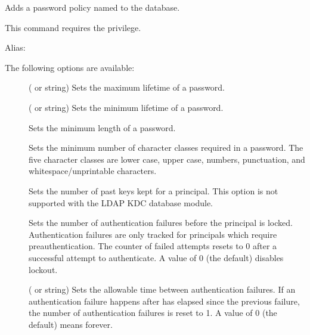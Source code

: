 \documentclass[letterpaper,10pt,english]{sphinxmanual}
\begin{document}
Adds a password policy named  to the database.

This command requires the  privilege.

Alias: 

The following options are available:
\begin{description}
\item[{ }] \leavevmode
( or  string) Sets the maximum
lifetime of a password.

\item[{ }] \leavevmode
( or  string) Sets the minimum
lifetime of a password.

\item[{ }] \leavevmode
Sets the minimum length of a password.

\item[{ }] \leavevmode
Sets the minimum number of character classes required in a
password.  The five character classes are lower case, upper case,
numbers, punctuation, and whitespace/unprintable characters.

\item[{ }] \leavevmode
Sets the number of past keys kept for a principal.  This option is
not supported with the LDAP KDC database module.

\end{description}
\label{\detokenize{admin/admin_commands/kadmin_local:policy-maxfailure}}\begin{description}
\item[{ }] \leavevmode
Sets the number of authentication failures before the principal is
locked.  Authentication failures are only tracked for principals
which require preauthentication.  The counter of failed attempts
resets to 0 after a successful attempt to authenticate.  A
 value of 0 (the default) disables lockout.

\end{description}
\label{\detokenize{admin/admin_commands/kadmin_local:policy-failurecountinterval}}\begin{description}
\item[{ }] \leavevmode
( or  string) Sets the allowable time
between authentication failures.  If an authentication failure
happens after  has elapsed since the previous
failure, the number of authentication failures is reset to 1.  A
 value of 0 (the default) means forever.

\end{description}
\end{document}
